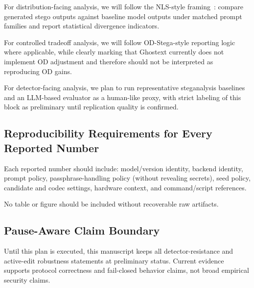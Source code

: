 For distribution-facing analysis, we will follow the NLS-style framing~\cite{ziegler2019neural}: compare generated stego outputs against baseline model outputs under matched prompt families and report statistical divergence indicators.

For controlled tradeoff analysis, we will follow OD-Stega-style reporting logic~\cite{huang2026odstega} where applicable, while clearly marking that Ghostext currently does not implement OD adjustment and therefore should not be interpreted as reproducing OD gains.

For detector-facing analysis, we plan to run representative steganalysis baselines and an LLM-based evaluator as a human-like proxy, with strict labeling of this block as preliminary until replication quality is confirmed.

\subsection{Reproducibility Requirements for Every Reported Number}

Each reported number should include: model/version identity, backend identity, prompt policy, passphrase-handling policy (without revealing secrets), seed policy, candidate and codec settings, hardware context, and command/script references.

No table or figure should be included without recoverable raw artifacts.

\subsection{Pause-Aware Claim Boundary}

Until this plan is executed, this manuscript keeps all detector-resistance and active-edit robustness statements at preliminary status. Current evidence supports protocol correctness and fail-closed behavior claims, not broad empirical security claims.
